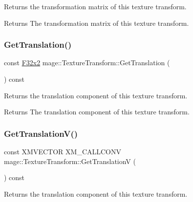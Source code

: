 Returns the transformation matrix of this texture transform.

\begin{DoxyReturn}{Returns}
The transformation matrix of this texture transform. 
\end{DoxyReturn}
\mbox{\label{classmage_1_1_texture_transform_ac57e70558e24264fa178f7c7c821397f}} 
\subsubsection{\texorpdfstring{Get\+Translation()}{GetTranslation()}}
{\footnotesize\ttfamily const \mbox{\hyperlink{namespacemage_aee4759dedc8def6c6dec26b5c7eddf29}{F32x2}} mage\+::\+Texture\+Transform\+::\+Get\+Translation (\begin{DoxyParamCaption}{ }\end{DoxyParamCaption}) const\hspace{0.3cm}{\ttfamily [noexcept]}}

Returns the translation component of this texture transform.

\begin{DoxyReturn}{Returns}
The translation component of this texture transform. 
\end{DoxyReturn}
\mbox{\label{classmage_1_1_texture_transform_a17417d31cbffb2c987269c1e94ad37de}} 
\subsubsection{\texorpdfstring{Get\+Translation\+V()}{GetTranslationV()}}
{\footnotesize\ttfamily const X\+M\+V\+E\+C\+T\+OR X\+M\+\_\+\+C\+A\+L\+L\+C\+O\+NV mage\+::\+Texture\+Transform\+::\+Get\+TranslationV (\begin{DoxyParamCaption}{ }\end{DoxyParamCaption}) const\hspace{0.3cm}{\ttfamily [noexcept]}}

Returns the translation component of this texture transform.

